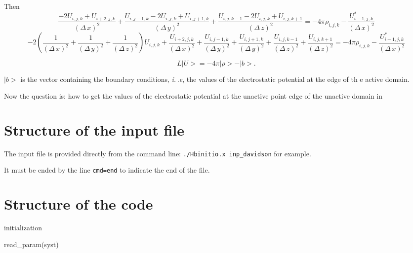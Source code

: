 \documentclass[11pt,a4paper]{article}
\begin{document}
Then
\begin{equation}
  \frac{-2U_{i,j,k}+U_{i+2,j,k}}{(\Delta\,x)^2}+
  \frac{U_{i,j-1,k}-2U_{i,j,k}+U_{i,j+1,k}}{(\Delta\,y)^2}+
  \frac{U_{i,j,k-1}-2U_{i,j,k}+U_{i,j,k+1}}{(\Delta\,z)^2}=-4\pi\rho_{i,j,k}-  \frac{U_{i-1,j,k}^*}{(\Delta\,x)^2}
\end{equation}
\begin{equation}
  -2\left(\frac{1}{(\Delta\,x)^2}+\frac{1}{(\Delta\,y)^2}+\frac{1}{(\Delta\,z)^2}\right)U_{i,j,k}+
  \frac{U_{i+2,j,k}}{(\Delta\,x)^2}+
  \frac{U_{i,j-1,k}}{(\Delta\,y)^2}+
  \frac{U_{i,j+1,k}}{(\Delta\,y)^2}+
  \frac{U_{i,j,k-1}}{(\Delta\,z)^2}+
  \frac{U_{i,j,k+1}}{(\Delta\,z)^2}
  =-4\pi\rho_{i,j,k}-  \frac{U_{i-1,j,k}^*}{(\Delta\,x)^2}
\end{equation}


\begin{equation}
  L|U>=-4\pi|\rho>-|b>.
\end{equation}

$|b>$ is the vector containing the boundary conditions, \emph{i.\,.e}, the values of the electrostatic potential at the edge of th
e active domain.

Now the question is: how to get the values of the electrostatic potential at the unactive point edge of the unactive domain in

\newpage

\section{Structure of the input file}

The input file is provided directly from the command line: \verb+./Hbinitio.x inp_davidson+ for example.

It must be ended by the line \verb+cmd=end+ to indicate the end of the file.

\newpage

\section{Structure of the code}


\begin{algorithm}[H]
 initialization\;
 \caption{read\_param(syst)}
\end{algorithm}
\end{document}
